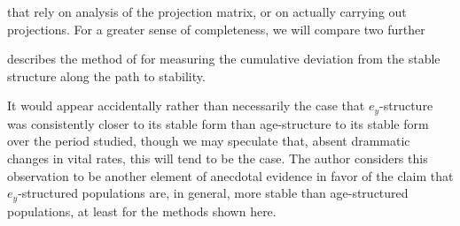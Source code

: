 that rely on analysis of the
projection matrix, or on actually carrying out projections. For a greater sense of completeness, we will compare two further

\citet[p. 101]{caswell2001matrix} describes the
method of \citet{cohen1979cumulative} for measuring the cumulative deviation
from the stable structure along the path to stability.




It would appear accidentally rather than necessarily the case that
$e_y$-structure was consistently closer to its stable form than age-structure to
its stable form over the period studied, though we may speculate that, absent
drammatic changes in vital rates, this will tend to be the case. The author
considers this observation to be another element of anecdotal evidence in favor
of the claim that $e_y$-structured populations are, in general, more stable than
age-structured populations, at least for the methods shown here.




 \FloatBarrier




